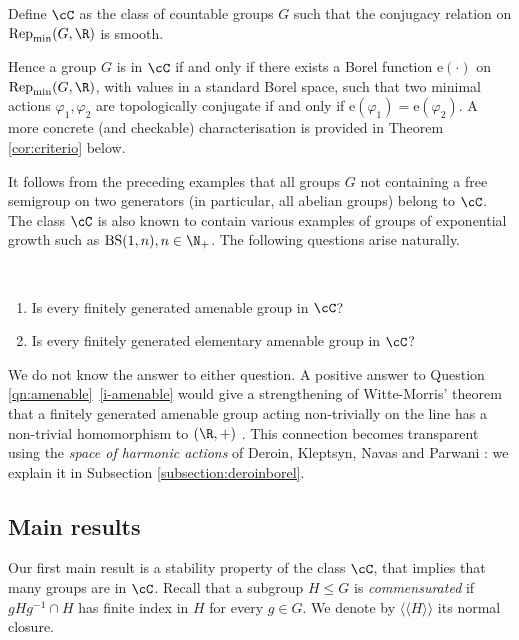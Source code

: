 \documentclass[reqno]{amsart}
\begin{document}
\begin{defn}
	Define $\cC$ as the class of countable groups $G$ such that the conjugacy relation on $\mathrm{Rep}_\mathrm{min}(G, \R)$ is smooth.
\end{defn}

Hence a group $G$ is in $\cC$ if and only if there exists a Borel function $\mathrm{e}(\cdot)$ on $\mathrm{Rep}_\mathrm{min}(G, \R)$, with values in a standard Borel space, such that two minimal actions  $\varphi_1,\varphi_2$ are topologically conjugate if and only if $\mathrm{e}(\varphi_1)=\mathrm{e}(\varphi_2)$. A more concrete (and checkable) characterisation is provided in Theorem \ref{cor:criterio} below.



It follows from the preceding examples that all groups $G$ not containing a free semigroup on two generators (in particular, all abelian groups) belong to $\cC$. The class $\cC$ is also known to contain various examples of groups of exponential growth such as $\mathrm{BS}(1,n), n \in \N_+$. The following questions arise naturally.

\begin{qnnum} \label{qn:amenable} \ 
\begin{enumerate}
    \item \label{i-amenable} Is every finitely generated amenable group in $\cC$?
	\item  \label{i-elementary-amenable} Is every finitely generated elementary amenable group in $\cC$?
\end{enumerate}
\end{qnnum}
We do not know the answer to either question. A positive answer to Question \ref{qn:amenable}~\eqref{i-amenable} would give a strengthening of Witte-Morris' theorem that a finitely generated amenable group acting non-trivially on the line has a non-trivial homomorphism to $(\R, +)$ \cite{WitteMorris2006}. This connection becomes transparent using the \emph{space of harmonic actions} of Deroin, Kleptsyn, Navas and Parwani \cite{DKNP}: we explain it in Subsection \ref{subsection:deroinborel}.


\subsection{Main results} Our first main result is a stability property of the class $\cC$, that implies that many groups are in $\cC$. Recall that a subgroup $H\le G$ is \emph{commensurated} if $gHg^{-1}\cap H$ has finite index in $H$ for every $g\in G$. We denote by $\langle\langle H \rangle \rangle$ its normal closure.
\end{document}
